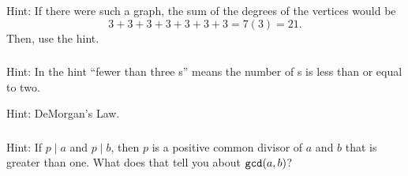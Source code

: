 \subsubsection*{ \answers}
    Hint: If there were such a graph, the sum of the degrees of the vertices would be     
        $$3+3+3+3+3+3+3=7(3)=21.$$
    Then, use the hint.

\subsubsection*{ \answers}
\begin{apart}
    \item Hint: In the hint ``fewer than three s'' means the number of s is less than or equal to two.
    \item Hint: DeMorgan's Law.
\end{apart}

\subsubsection*{ \answers}
  Hint: If $p \mid a$ and $p \mid b$, then $p$ is a positive common divisor of $a$ and $b$ that is greater than one.  What does that tell you about $\texttt{gcd}(a,b)$?





